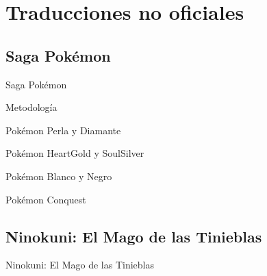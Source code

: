 
\section[Fan-traducciones]{Traducciones no oficiales}
\subsection{Saga Pokémon}
\begin{frame}{Saga Pokémon}

\end{frame}

\begin{frame}{Metodología}
\end{frame}

\begin{frame}{Pokémon Perla y Diamante}

\end{frame}

\begin{frame}{Pokémon HeartGold y SoulSilver}

\end{frame}

\begin{frame}{Pokémon Blanco y Negro}

\end{frame}

\begin{frame}{Pokémon Conquest}

\end{frame}

\subsection{Ninokuni: El Mago de las Tinieblas}
\begin{frame}{Ninokuni: El Mago de las Tinieblas}

\end{frame}
